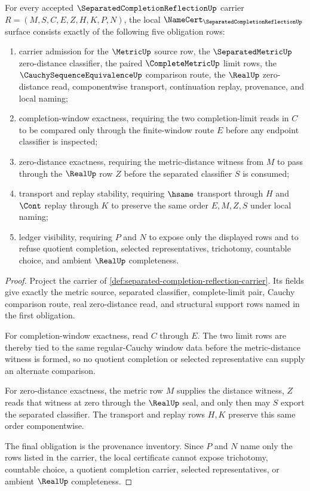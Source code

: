 \begin{theorem}
\label{thm:separated-completion-reflection-namecert-obligations}
For every accepted $\SeparatedCompletionReflectionUp$ carrier $R=(M,S,C,E,Z,H,K,P,N)$, the local $\NameCert_{\SeparatedCompletionReflectionUp}$ surface consists exactly of the following five obligation rows:
\begin{enumerate}
\item carrier admission for the $\MetricUp$ source row, the $\SeparatedMetricUp$ zero-distance classifier, the paired $\CompleteMetricUp$ limit rows, the $\CauchySequenceEquivalenceUp$ comparison route, the $\RealUp$ zero-distance read, componentwise transport, continuation replay, provenance, and local naming;
\item completion-window exactness, requiring the two completion-limit reads in $C$ to be compared only through the finite-window route $E$ before any endpoint classifier is inspected;
\item zero-distance exactness, requiring the metric-distance witness from $M$ to pass through the $\RealUp$ row $Z$ before the separated classifier $S$ is consumed;
\item transport and replay stability, requiring $\hsame$ transport through $H$ and $\Cont$ replay through $K$ to preserve the same order $E,M,Z,S$ under local naming;
\item ledger visibility, requiring $P$ and $N$ to expose only the displayed rows and to refuse quotient completion, selected representatives, trichotomy, countable choice, and ambient $\RealUp$ completeness.
\end{enumerate}
\end{theorem}
\begin{proof}
Project the carrier of \autoref{def:separated-completion-reflection-carrier}. Its fields give exactly the metric source, separated classifier, complete-limit pair, Cauchy comparison route, real zero-distance read, and structural support rows named in the first obligation.

For completion-window exactness, read $C$ through $E$. The two limit rows are thereby tied to the same regular-Cauchy window data before the metric-distance witness is formed, so no quotient completion or selected representative can supply an alternate comparison.

For zero-distance exactness, the metric row $M$ supplies the distance witness, $Z$ reads that witness at zero through the $\RealUp$ seal, and only then may $S$ export the separated classifier. The transport and replay rows $H,K$ preserve this same order componentwise.

The final obligation is the provenance inventory. Since $P$ and $N$ name only the rows listed in the carrier, the local certificate cannot expose trichotomy, countable choice, a quotient completion carrier, selected representatives, or ambient $\RealUp$ completeness.
\end{proof}

